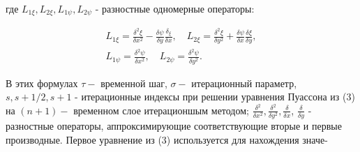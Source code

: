 \documentclass[10pt]{article}
\begin{document}
где $L_{1 \xi}, L_{2 \xi}, L_{1 \psi}, L_{2 \psi}$ - разностные одномерные операторы:



\[

\begin{gathered}

L_{1 \xi}=\frac{\delta^{2} \xi}{\delta x^{2}}-\frac{\delta \psi}{\delta y} \frac{\delta_{\xi}}{\delta x}, \quad L_{2 \xi}=\frac{\delta^{2} \xi}{\delta y^{2}}+\frac{\delta \psi}{\delta x} \frac{\delta \xi}{\delta y}, \\

L_{1 \psi}=\frac{\delta^{2} \psi}{\delta x^{2}}, \quad L_{2 \psi}=\frac{\delta^{2} \psi}{\delta y^{2}} .

\end{gathered}

\]



В этих формулах $\tau-$ временной шаг, $\sigma-$ итерационный параметр, $s, s+1 / 2, s+1$ - итерационные индексы при решении уравнения Пуассона из (3) на $(n+1)-$ временном слое итерационшым методом; $\frac{\delta^{2}}{\delta x^{2}}, \frac{\delta^{2}}{\delta y^{2}}, \frac{\delta}{\delta x}$, $\frac{\delta}{\delta y}$ - разностные операторы, аппроксимирующие соответствующие вторые и первые производные. Первое уравнение из (3) используется для нахождения значе-
\end{document}
